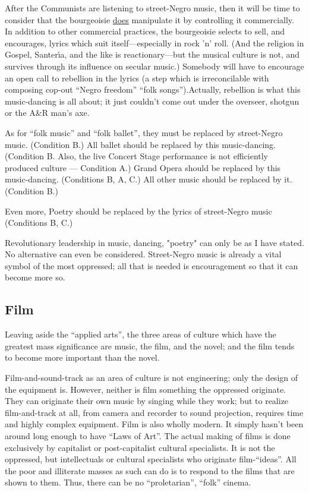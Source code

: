 After the Communists are listening to street-Negro music, then it
will be time to consider that the bourgeoisie \uline{does} manipulate it by
controlling it commercially. In addition to other commercial practices,
the bourgeoisie selects to sell, and encourages, lyrics 
which suit itself---especially in rock 'n' roll. (And the religion in
Gospel, Santer\'{\i}a, and the like is reactionary---but the musical
culture is not, and survives through its influence on secular
music.) Somebody will have to encourage an open call to rebellion
in the lyrics (a step which is irreconcilable with composing cop-out
\enquote{Negro freedom} \enquote{folk songs}).Actually, rebellion is what this
music-dancing is all about; it just couldn't come out under the 
overseer, shotgun or the A\&R man's axe. 

As for \enquote{folk music} and \enquote{folk ballet}, they must be replaced by 
street-Negro music. (Condition B.) All ballet should be replaced 
by this music-dancing. (Condition B. Also, the live Concert Stage
performance is not efficiently produced culture --- Condition A.)
Grand Opera should be replaced by this music-dancing. (Conditions
B, A, C.) All other music should be replaced by it. (Condition B.) 

Even more, Poetry should be replaced by the lyrics of street-Negro
music (Conditions B, C.) 

Revolutionary leadership in music, dancing, "poetry" can only be
as I have stated. No alternative can even be considered. Street-Negro
music is already a vital symbol of the most oppressed; all 
that is needed is encouragement so that it can become more so. 

\subsection*{Film}

Leaving aside the \enquote{applied arts}, the three areas of culture which
have the greatest mass significance are music, the film, and the
novel; and the film tends to become more important than the novel. 

Film-and-sound-track as an area of culture is not engineering;
only the design of the equipment is. However, neither is film
something the oppressed originate. They can originate their own
music by singing while they work; but to realize film-and-track
at all, from camera and recorder to sound projection, requires
time and highly complex equipment. Film is also wholly modern.
It simply hasn't been around long enough to have \enquote{Laws of Art}.
The actual making of films is done exclusively by capitalist or
post-capitalist cultural specialists. It is not the oppressed, but 
intellectuals or cultural specialists who originate film-\enquote{ideas}.
All the poor and illiterate masses as such can do is to respond 
to the films that are shown to them. Thus, there can be no \enquote{proletarian}, 
\enquote{folk} cinema. 

